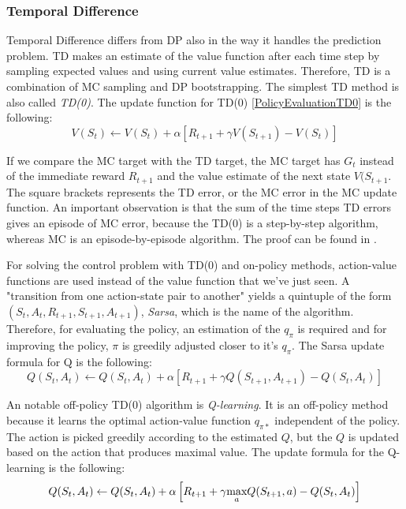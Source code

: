 \subsubsection{Temporal Difference}\label{Temporal Difference}
Temporal Difference differs from DP also in the way it handles the prediction problem. TD makes an estimate of the value function after each time step by sampling expected values and using current value estimates. Therefore, TD is a combination of MC sampling and DP bootstrapping. The simplest TD method is also called \textit{TD(0)}. The update function for TD(0) \ref{PolicyEvaluationTD0} is the following:
\begin{equation}\label{PolicyEvaluationTD0}
V(S_{t})\leftarrow V(S_{t})+\alpha \left [ R_{t+1}+\gamma V(S_{t+1})-V(S_{t}) \right ]
\end{equation}

If we compare the MC target with the TD target, the MC target has $G_{t}$ instead of the immediate reward $R_{t+1}$ and the value estimate of the next state $V(S_{t+1}$. The square brackets represents the TD error, or the MC error in the MC update function. An important observation is that the sum of the time steps TD errors gives an episode of MC error, because the TD(0) is a step-by-step algorithm, whereas MC is an episode-by-episode algorithm. The proof can be found in \cite{Sutton}.

For solving the control problem with TD(0) and on-policy methods, action-value functions are used instead of the value function that we've just seen. A "transition from one action-state pair to another" \cite{Sutton} yields a quintuple of the form $(S_{t}, A_{t}, R_{t+1}, S_{t+1}, A_{t+1})$, \textit{Sarsa}, which is the name of the algorithm. Therefore, for evaluating the policy, an estimation of the $q_{\pi}$ is required and for improving the policy, $\pi$ is greedily adjusted closer to it's $q_{\pi}$. The Sarsa update formula for Q is the following:
\begin{equation}\label{Sarsa}
Q(S_{t}, A_{t})\leftarrow Q(S_{t}, A_{t})+\alpha \left [ R_{t+1}+\gamma Q(S_{t+1}, A_{t+1})-Q(S_{t}, A_{t}) \right ]
\end{equation}

An notable off-policy TD(0) algorithm is \textit{Q-learning}. It is an off-policy method because it learns the optimal action-value function $q_{\pi*}$ independent of the policy. The action is picked greedily according to the estimated $Q$, but the $Q$ is updated based on the action that produces maximal value. The update formula for the Q-learning is the following:
\begin{equation}\label{Qlearning}
Q(S_{t}, A_{t})\leftarrow Q(S_{t}, A_{t})+\alpha \left [ R_{t+1}+\gamma \underset{a}{\textup{max}} Q(S_{t+1}, a)-Q(S_{t}, A_{t}) \right ]
\end{equation}

